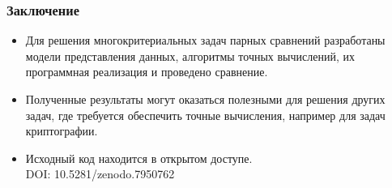 \documentclass[ucs, notheorems, handout]{beamer}
\begin{document}
\begin{frame}
    \frametitle{Заключение}
    \begin{itemize}
        
        
        
        \item Для решения многокритериальных задач парных сравнений разработаны модели представления данных, алгоритмы точных вычислений, их программная реализация и проведено сравнение.
			
        \item Полученные результаты могут оказаться полезными для решения других задач, где требуется обеспечить точные вычисления, например для задач криптографии.
        \item Исходный код находится в открытом доступе.\\
        DOI: 10.5281/zenodo.7950762
        
    \end{itemize}

\end{frame}


%     
% 	

\end{document}
